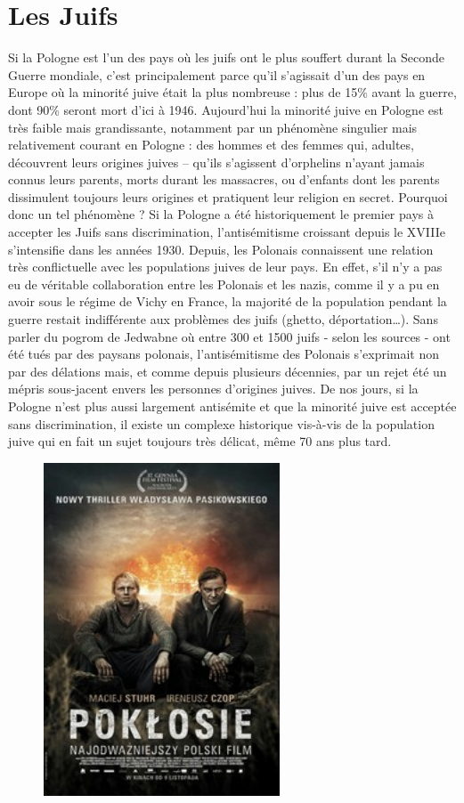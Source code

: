 \documentclass[12pt, twocolumn]{amsart}
\begin{document}
\section{Les Juifs}
Si la Pologne est l’un des pays où les juifs ont le plus souffert durant la Seconde Guerre mondiale, c’est principalement parce qu’il s’agissait d’un des pays en Europe où la minorité juive était la plus nombreuse : plus de 15\% avant la guerre, dont 90\%  seront mort d'ici à 1946. Aujourd’hui la minorité juive en Pologne est très faible mais grandissante, notamment par un phénomène singulier mais relativement courant en Pologne : des hommes et des femmes qui, adultes, découvrent leurs origines juives – qu’ils s’agissent d’orphelins n’ayant jamais connus leurs parents, morts durant les massacres, ou d’enfants dont les parents dissimulent toujours leurs origines et pratiquent leur religion en secret. Pourquoi donc un tel phénomène ? Si la Pologne a été historiquement le premier pays à accepter les Juifs sans discrimination, l’antisémitisme croissant depuis le XVIIIe s'intensifie dans les années 1930. Depuis, les Polonais connaissent une relation très conflictuelle avec les populations juives de leur pays. En effet, s’il n’y a pas eu de véritable collaboration entre les Polonais et les nazis, comme il y a pu en avoir sous le régime de Vichy en France, la majorité de la population pendant la guerre restait indifférente aux problèmes des juifs (ghetto, déportation…). Sans parler du pogrom de Jedwabne où entre 300 et 1500 juifs - selon les sources - ont été tués par des paysans polonais, l’antisémitisme des Polonais s’exprimait non par des délations mais, et comme depuis plusieurs décennies, par un rejet été un mépris sous-jacent envers les personnes d'origines juives. De nos jours, si la Pologne n’est plus aussi largement antisémite et que la minorité juive est acceptée sans discrimination, il existe un complexe historique vis-à-vis de la population juive qui en fait un sujet toujours très délicat, même 70 ans plus tard.
\begin{figure}

\includegraphics[width=7cm]{poklosie.jpg}

\end{figure}
\end{document}
